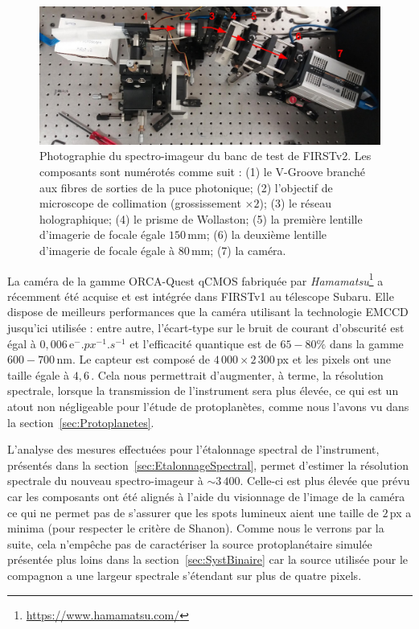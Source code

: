 \begin{figure}[ht!]
    \centering
    \includegraphics[width=\figwidth]{Figure_Chap2/20210817_Spectro04.jpg}
    \caption[Photographie du spectro-imageur du banc de test de FIRSTv2.]{Photographie du spectro-imageur du banc de test de FIRSTv2. Les composants sont numérotés comme suit : (1) le V-Groove branché aux fibres de sorties de la puce photonique; (2) l'objectif de microscope de collimation (grossissement $\times 2$); (3) le réseau holographique; (4) le prisme de Wollaston; (5) la première lentille d'imagerie de focale égale $150 \,$mm; (6) la deuxième lentille d'imagerie de focale égale à $80 \,$mm; (7) la caméra.}
    \label{fig:SpectroPhoto}
\end{figure}

La caméra de la gamme ORCA-Quest qCMOS fabriquée par \textit{Hamamatsu}\footnote{\url{https://www.hamamatsu.com/}} a récemment été acquise et est intégrée dans \ac{FIRSTv1} au télescope Subaru. Elle dispose de meilleurs performances que la caméra utilisant la technologie \ac{EMCCD} jusqu'ici utilisée : entre autre, l'écart-type sur le bruit de courant d'obscurité est égal à $0,006 \,\text{e}^-.px^{-1}.s^{-1}$ et l'efficacité quantique est de $65 - 80\%$ dans la gamme $600 - 700\,$nm. Le capteur est composé de $4\,000 \times 2\,300 \,$px et les pixels ont une taille égale à $4,6 \,$\um. Cela nous permettrait d'augmenter, à terme, la résolution spectrale, lorsque la transmission de l'instrument sera plus élevée, ce qui est un atout non négligeable pour l'étude de protoplanètes, comme nous l'avons vu dans la section~\ref{sec:Protoplanetes}.

L'analyse des mesures effectuées pour l'étalonnage spectral de l'instrument, présentés dans la section~\ref{sec:EtalonnageSpectral}, permet d'estimer la résolution spectrale du nouveau spectro-imageur à $\sim 3\,400$. Celle-ci est plus élevée que prévu car les composants ont été alignés à l'aide du visionnage de l'image de la caméra ce qui ne permet pas de s'assurer que les spots lumineux aient une taille de $2 \,$px a minima (pour respecter le critère de Shanon). Comme nous le verrons par la suite, cela n'empêche pas de caractériser la source protoplanétaire simulée présentée plus loins dans la section~\ref{sec:SystBinaire} car la source utilisée pour le compagnon a une largeur spectrale s'étendant sur plus de quatre pixels.


